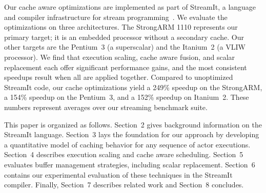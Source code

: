 Our cache aware optimizations are implemented as part of StreamIt, a
language and compiler infrastructure for stream
programming~\cite{streamitcc}.  We evaluate the optimizations on three
architectures.  The StrongARM 1110 represents our primary target; it
is an embedded processor without a secondary cache.  Our other targets
are the Pentium~3 (a superscalar) and the Itanium~2 (a VLIW
processor).  We find that execution scaling, cache aware fusion, and
scalar replacement each offer significant performance gains, and the
most consistent speedups result when all are applied together.
Compared to unoptimized StreamIt code, our cache optimizations yield a
249\% speedup on the StrongARM, a 154\% speedup on the Pentium~3, and
a 152\% speedup on Itanium~2.  These numbers represent averages over
our streaming benchmark suite.

This paper is organized as follows.  Section~2 gives background
information on the StreamIt language.  Section~3 lays the foundation
for our approach by developing a quantitative model of caching
behavior for any sequence of actor executions.  Section~4 describes
execution scaling and cache aware scheduling.  Section~5 evaluates
buffer management strategies, including scalar replacement.  Section~6
contains our experimental evaluation of these techniques in the
StreamIt compiler.  Finally, Section~7 describes related work and
Section~8 concludes.


